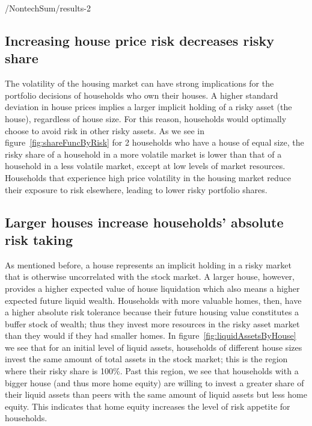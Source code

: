 \documentclass[PortfolioChoiceWithRiskyHousing]{subfiles}
\begin{document}
\renewcommand{\figName}{shareFuncByEquity}
\renewcommand{\figFile}{\figName}

\begin{verbatimwrite}{\LaTeXOutput/NontechSum/results-2}

  \subsection{Increasing house price risk decreases risky share}
  
  \renewcommand{\figName}{shareFuncByRisk}
  \renewcommand{\figFile}{\figName}

  The volatility of the housing market can have strong implications for the portfolio decisions of households who own their houses. A higher standard deviation in house prices implies a larger implicit holding of a risky asset (the house), regardless of house size. For this reason, households would optimally choose to avoid risk in other risky assets. As we see in  figure~\ref{fig:shareFuncByRisk} for 2 households who have a house of equal size, the risky share of a household in a more volatile market is lower than that of a household in a less volatile market, except at low levels of market resources. Households that experience high price volatility in the housing market reduce their exposure to risk elsewhere, leading to lower risky portfolio shares.

\end{verbatimwrite}


\subsection{Larger houses increase households' absolute risk taking}

\renewcommand{\figName}{liquidAssetsByHouse}
\renewcommand{\figFile}{\figName}

As mentioned before, a house represents an implicit holding in a risky market that is otherwise uncorrelated with the stock market. A larger house, however, provides a higher expected value of house liquidation which also means a higher expected future liquid wealth. Households with more valuable homes, then, have a higher absolute risk tolerance because their future housing value constitutes a buffer stock of wealth; thus they invest more resources in the risky asset market than they would if they had smaller homes. In figure~\ref{fig:liquidAssetsByHouse} we see that for an initial level of liquid assets, households of different house sizes invest the same amount of total assets in the stock market; this is the region where their risky share is 100\%. Past this region, we see that households with a bigger house (and thus more home equity) are willing to invest a greater share of their liquid assets than peers with the same amount of liquid assets but less home equity. This indicates that home equity increases the level of risk appetite for households.
\end{document}
